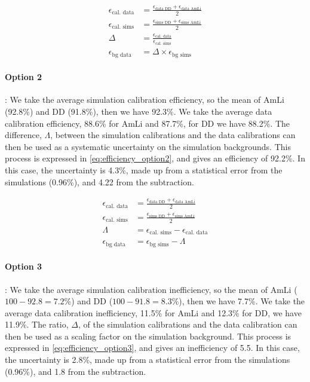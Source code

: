 \begin{align}
    \epsilon_{\textrm{cal. data}} &= \frac{\epsilon_{\textrm{data DD}} + \epsilon_{\textrm{data AmLi}}}{2} \\
    \epsilon_{\textrm{cal. sims}} &= \frac{\epsilon_{\textrm{sims DD}} + \epsilon_{\textrm{sims AmLi}}}{2} \\
    \Delta &= \frac{\epsilon_{\textrm{cal. data}}}{\epsilon_{\textrm{cal. sims}}} \\
    \epsilon_{\textrm{bg data}} &= \Delta \times \epsilon_{\textrm{bg sims}}
    \label{eq:efficiency_option1}
\end{align}

\paragraph{Option 2}:
We take the average simulation calibration efficiency, so the mean of AmLi (92.8\%) and DD (91.8\%), then we have 92.3\%.
We take the average data calibration efficiency, 88.6\% for AmLi and 87.7\%, for DD we have 88.2\%.
The difference, $\Lambda$, between the simulation calibrations and the data calibrations can then be used as a systematic uncertainty on the simulation backgrounds.
This process is expressed in \autoref{eq:efficiency_option2}, and gives an efficiency of 92.2\%.
In this case, the uncertainty is 4.3\%, made up from a statistical error from the simulations (0.96\%), and 4.22 from the subtraction.

\begin{align}
    \epsilon_{\textrm{cal. data}} &= \frac{\epsilon_{\textrm{data DD}} + \epsilon_{\textrm{data AmLi}}}{2} \\
    \epsilon_{\textrm{cal. sims}} &= \frac{\epsilon_{\textrm{sims DD}} + \epsilon_{\textrm{sims AmLi}}}{2} \\
    \Lambda &= \epsilon_{\textrm{cal. sims}} - \epsilon_{\textrm{cal. data}} \\
    \epsilon_{\textrm{bg data}} &= \epsilon_{\textrm{bg sims}} - \Lambda
    \label{eq:efficiency_option2} 
\end{align}

\paragraph{Option 3}:
We take the average simulation calibration inefficiency, so the mean of AmLi ($100 - 92.8 = 7.2$\%) and DD ($100 - 91.8 = 8.3$\%), then we have 7.7\%.
We take the average data calibration inefficiency, 11.5\% for AmLi and 12.3\% for DD, we have 11.9\%.
The ratio, $\Delta$, of the simulation calibrations and the data calibration can then be used as a scaling factor on the simulation background.
This process is expressed in \autoref{eq:efficiency_option3}, and gives an inefficiency of 5.5.
In this case, the uncertainty is 2.8\%, made up from a statistical error from the simulations (0.96\%), and 1.8 from the subtraction.

